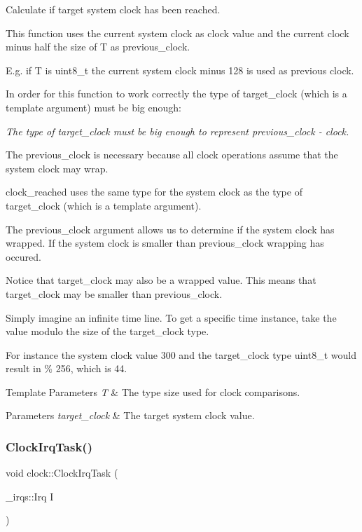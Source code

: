 Calculate if target system clock has been reached. 

This function uses the current system clock as clock value and the current clock minus half the size of T as previous\+\_\+clock.

E.\+g. if T is uint8\+\_\+t the current system clock minus 128 is used as previous clock.

In order for this function to work correctly the type of target\+\_\+clock (which is a template argument) must be big enough\+:

{\itshape The type of target\+\_\+clock must be big enough to represent {\ttfamily previous\+\_\+clock -\/ clock}.}

The previous\+\_\+clock is necessary because all clock operations assume that the system clock may wrap.

clock\+\_\+reached uses the same type for the system clock as the type of target\+\_\+clock (which is a template argument).

The previous\+\_\+clock argument allows us to determine if the system clock has wrapped. If the system clock is smaller than previous\+\_\+clock wrapping has occured.

Notice that target\+\_\+clock may also be a wrapped value. This means that target\+\_\+clock may be smaller than previous\+\_\+clock.

Simply imagine an infinite time line. To get a specific time instance, take the value modulo the size of the target\+\_\+clock type.

For instance the system clock value 300 and the target\+\_\+clock type uint8\+\_\+t would result in { \% 256}, which is 44.


\begin{DoxyTemplParams}{Template Parameters}
{\em T} & The type size used for clock comparisons. \\
\hline
\end{DoxyTemplParams}

\begin{DoxyParams}{Parameters}
{\em target\+\_\+clock} & The target system clock value. \\
\hline
\end{DoxyParams}
\hypertarget{namespaceclock_aa67adb0b2215c44a4a770b6c36cfe8a7}{}\label{namespaceclock_aa67adb0b2215c44a4a770b6c36cfe8a7} 
\subsubsection{\texorpdfstring{Clock\+Irq\+Task()}{ClockIrqTask()}}
{\footnotesize\ttfamily void clock\+::\+Clock\+Irq\+Task (\begin{DoxyParamCaption}\item[{\+\_\+irqs\+::\+Irq}]{I }\end{DoxyParamCaption})}



